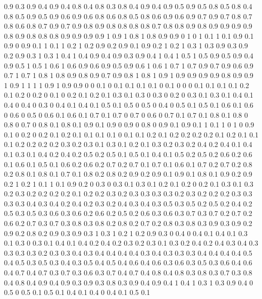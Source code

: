 0.9 0.3
0.9 0.4
0.9 0.4
0.8 0.4
0.8 0.3
0.8 0.4
0.9 0.4
0.9 0.5
0.9 0.5
0.8 0.5
0.8 0.4
0.8 0.5
0.9 0.5
0.9 0.6
0.9 0.6
0.8 0.6
0.8 0.5
0.8 0.6
0.9 0.6
0.9 0.7
0.9 0.7
0.8 0.7
0.8 0.6
0.8 0.7
0.9 0.7
0.9 0.8
0.9 0.8
0.8 0.8
0.8 0.7
0.8 0.8
0.9 0.8
0.9 0.9
0.9 0.9
0.8 0.9
0.8 0.8
0.8 0.9
0.9 0.9
0.9 1
0.9 1
0.8 1
0.8 0.9
0.9 0
1 0
1 0.1
1 0.1
0.9 0.1
0.9 0
0.9 0.1
1 0.1
1 0.2
1 0.2
0.9 0.2
0.9 0.1
0.9 0.2
1 0.2
1 0.3
1 0.3
0.9 0.3
0.9 0.2
0.9 0.3
1 0.3
1 0.4
1 0.4
0.9 0.4
0.9 0.3
0.9 0.4
1 0.4
1 0.5
1 0.5
0.9 0.5
0.9 0.4
0.9 0.5
1 0.5
1 0.6
1 0.6
0.9 0.6
0.9 0.5
0.9 0.6
1 0.6
1 0.7
1 0.7
0.9 0.7
0.9 0.6
0.9 0.7
1 0.7
1 0.8
1 0.8
0.9 0.8
0.9 0.7
0.9 0.8
1 0.8
1 0.9
1 0.9
0.9 0.9
0.9 0.8
0.9 0.9
1 0.9
1 1
1 1
0.9 1
0.9 0.9
0 0
0.1 0
0.1 0.1
0.1 0.1
0 0.1
0 0
0 0.1
0.1 0.1
0.1 0.2
0.1 0.2
0 0.2
0 0.1
0 0.2
0.1 0.2
0.1 0.3
0.1 0.3
0 0.3
0 0.2
0 0.3
0.1 0.3
0.1 0.4
0.1 0.4
0 0.4
0 0.3
0 0.4
0.1 0.4
0.1 0.5
0.1 0.5
0 0.5
0 0.4
0 0.5
0.1 0.5
0.1 0.6
0.1 0.6
0 0.6
0 0.5
0 0.6
0.1 0.6
0.1 0.7
0.1 0.7
0 0.7
0 0.6
0 0.7
0.1 0.7
0.1 0.8
0.1 0.8
0 0.8
0 0.7
0 0.8
0.1 0.8
0.1 0.9
0.1 0.9
0 0.9
0 0.8
0 0.9
0.1 0.9
0.1 1
0.1 1
0 1
0 0.9
0.1 0
0.2 0
0.2 0.1
0.2 0.1
0.1 0.1
0.1 0
0.1 0.1
0.2 0.1
0.2 0.2
0.2 0.2
0.1 0.2
0.1 0.1
0.1 0.2
0.2 0.2
0.2 0.3
0.2 0.3
0.1 0.3
0.1 0.2
0.1 0.3
0.2 0.3
0.2 0.4
0.2 0.4
0.1 0.4
0.1 0.3
0.1 0.4
0.2 0.4
0.2 0.5
0.2 0.5
0.1 0.5
0.1 0.4
0.1 0.5
0.2 0.5
0.2 0.6
0.2 0.6
0.1 0.6
0.1 0.5
0.1 0.6
0.2 0.6
0.2 0.7
0.2 0.7
0.1 0.7
0.1 0.6
0.1 0.7
0.2 0.7
0.2 0.8
0.2 0.8
0.1 0.8
0.1 0.7
0.1 0.8
0.2 0.8
0.2 0.9
0.2 0.9
0.1 0.9
0.1 0.8
0.1 0.9
0.2 0.9
0.2 1
0.2 1
0.1 1
0.1 0.9
0.2 0
0.3 0
0.3 0.1
0.3 0.1
0.2 0.1
0.2 0
0.2 0.1
0.3 0.1
0.3 0.2
0.3 0.2
0.2 0.2
0.2 0.1
0.2 0.2
0.3 0.2
0.3 0.3
0.3 0.3
0.2 0.3
0.2 0.2
0.2 0.3
0.3 0.3
0.3 0.4
0.3 0.4
0.2 0.4
0.2 0.3
0.2 0.4
0.3 0.4
0.3 0.5
0.3 0.5
0.2 0.5
0.2 0.4
0.2 0.5
0.3 0.5
0.3 0.6
0.3 0.6
0.2 0.6
0.2 0.5
0.2 0.6
0.3 0.6
0.3 0.7
0.3 0.7
0.2 0.7
0.2 0.6
0.2 0.7
0.3 0.7
0.3 0.8
0.3 0.8
0.2 0.8
0.2 0.7
0.2 0.8
0.3 0.8
0.3 0.9
0.3 0.9
0.2 0.9
0.2 0.8
0.2 0.9
0.3 0.9
0.3 1
0.3 1
0.2 1
0.2 0.9
0.3 0
0.4 0
0.4 0.1
0.4 0.1
0.3 0.1
0.3 0
0.3 0.1
0.4 0.1
0.4 0.2
0.4 0.2
0.3 0.2
0.3 0.1
0.3 0.2
0.4 0.2
0.4 0.3
0.4 0.3
0.3 0.3
0.3 0.2
0.3 0.3
0.4 0.3
0.4 0.4
0.4 0.4
0.3 0.4
0.3 0.3
0.3 0.4
0.4 0.4
0.4 0.5
0.4 0.5
0.3 0.5
0.3 0.4
0.3 0.5
0.4 0.5
0.4 0.6
0.4 0.6
0.3 0.6
0.3 0.5
0.3 0.6
0.4 0.6
0.4 0.7
0.4 0.7
0.3 0.7
0.3 0.6
0.3 0.7
0.4 0.7
0.4 0.8
0.4 0.8
0.3 0.8
0.3 0.7
0.3 0.8
0.4 0.8
0.4 0.9
0.4 0.9
0.3 0.9
0.3 0.8
0.3 0.9
0.4 0.9
0.4 1
0.4 1
0.3 1
0.3 0.9
0.4 0
0.5 0
0.5 0.1
0.5 0.1
0.4 0.1
0.4 0
0.4 0.1
0.5 0.1
